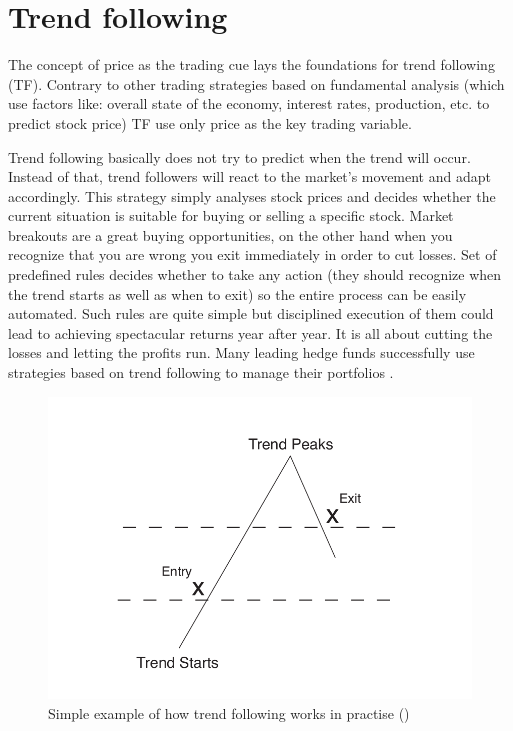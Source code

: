 
\section{Trend following}
\label{sec:trend-following}

The concept of price as the trading cue lays the foundations for trend following (TF). 
Contrary to other trading strategies based on fundamental analysis (which use factors like: overall state of the economy, interest rates, production, etc. to predict stock price)
TF use only price as the key trading variable. 

Trend following basically does not try to predict when the trend will occur. 
Instead of that, trend followers will react to the market's movement and adapt accordingly.
This strategy simply analyses stock prices and decides whether the current situation is suitable for buying or selling a specific stock.
Market breakouts are a great buying opportunities, on the other hand when you recognize that you are wrong you exit immediately in order to cut losses.
Set of predefined rules decides  whether to take any action (they should recognize when the trend starts as well as when to exit) so the entire process can be easily automated.
Such rules are quite simple but disciplined execution of them could lead to achieving spectacular returns year after year.
It is all about cutting the losses and letting the profits run.
Many leading hedge funds successfully use strategies based on trend following to manage their portfolios \cite{Trend01}.  

\begin{figure}[ht]
  \begin{center}
    \includegraphics[scale=.2]{trend_following.png}
  \end{center}
  \caption{Simple example of how trend following works in practise (\cite{Trend01})}
\end{figure}

